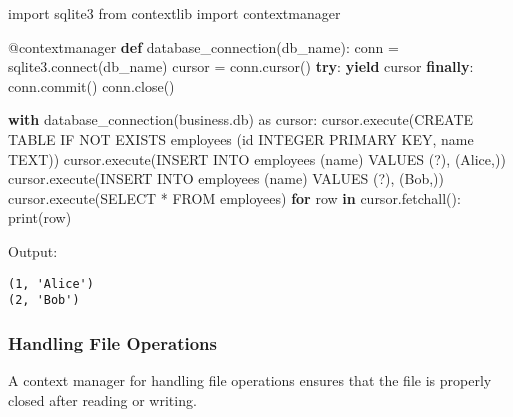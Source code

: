 \documentclass[
  letterpaper,
  DIV=11,
  numbers=noendperiod]{scrreprt}
\newenvironment{Shaded}{\begin{snugshade}}{\end{snugshade}}
\newcommand{\AttributeTok}[1]{\textcolor[rgb]{0.40,0.45,0.13}{#1}}
\newcommand{\BuiltInTok}[1]{\textcolor[rgb]{0.00,0.23,0.31}{#1}}
\newcommand{\ControlFlowTok}[1]{\textcolor[rgb]{0.00,0.23,0.31}{\textbf{#1}}}
\newcommand{\ExtensionTok}[1]{\textcolor[rgb]{0.00,0.23,0.31}{#1}}
\newcommand{\ImportTok}[1]{\textcolor[rgb]{0.00,0.46,0.62}{#1}}
\newcommand{\KeywordTok}[1]{\textcolor[rgb]{0.00,0.23,0.31}{\textbf{#1}}}
\newcommand{\NormalTok}[1]{\textcolor[rgb]{0.00,0.23,0.31}{#1}}
\newcommand{\OperatorTok}[1]{\textcolor[rgb]{0.37,0.37,0.37}{#1}}
\newcommand{\StringTok}[1]{\textcolor[rgb]{0.13,0.47,0.30}{#1}}
\begin{document}
\begin{Shaded}
\begin{Highlighting}[]
\ImportTok{import}\NormalTok{ sqlite3}
\ImportTok{from}\NormalTok{ contextlib }\ImportTok{import}\NormalTok{ contextmanager}

\AttributeTok{@contextmanager}
\KeywordTok{def}\NormalTok{ database\_connection(db\_name):}
\NormalTok{    conn }\OperatorTok{=}\NormalTok{ sqlite3.}\ExtensionTok{connect}\NormalTok{(db\_name)}
\NormalTok{    cursor }\OperatorTok{=}\NormalTok{ conn.cursor()}
    \ControlFlowTok{try}\NormalTok{:}
        \ControlFlowTok{yield}\NormalTok{ cursor}
    \ControlFlowTok{finally}\NormalTok{:}
\NormalTok{        conn.commit()}
\NormalTok{        conn.close()}

\ControlFlowTok{with}\NormalTok{ database\_connection(}\StringTok{\textquotesingle{}business.db\textquotesingle{}}\NormalTok{) }\ImportTok{as}\NormalTok{ cursor:}
\NormalTok{    cursor.execute(}\StringTok{\textquotesingle{}CREATE TABLE IF NOT EXISTS employees (id INTEGER PRIMARY KEY, name TEXT)\textquotesingle{}}\NormalTok{)}
\NormalTok{    cursor.execute(}\StringTok{\textquotesingle{}INSERT INTO employees (name) VALUES (?)\textquotesingle{}}\NormalTok{, (}\StringTok{\textquotesingle{}Alice\textquotesingle{}}\NormalTok{,))}
\NormalTok{    cursor.execute(}\StringTok{\textquotesingle{}INSERT INTO employees (name) VALUES (?)\textquotesingle{}}\NormalTok{, (}\StringTok{\textquotesingle{}Bob\textquotesingle{}}\NormalTok{,))}
\NormalTok{    cursor.execute(}\StringTok{\textquotesingle{}SELECT * FROM employees\textquotesingle{}}\NormalTok{)}
    \ControlFlowTok{for}\NormalTok{ row }\KeywordTok{in}\NormalTok{ cursor.fetchall():}
        \BuiltInTok{print}\NormalTok{(row)}
\end{Highlighting}
\end{Shaded}

Output:

\begin{verbatim}
(1, 'Alice')
(2, 'Bob')
\end{verbatim}

\subsubsection{Handling File Operations}\label{handling-file-operations}

A context manager for handling file operations ensures that the file is
properly closed after reading or writing.
\end{document}
